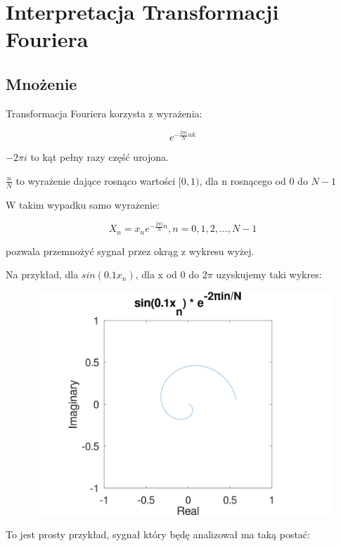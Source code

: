 \documentclass{article}
\begin{document}
\section{Interpretacja Transformacji Fouriera} 
\subsection{Mnożenie}

Transformacja Fouriera korzysta z wyrażenia:

\begin{equation}
e^{-\frac{2\pi i}{N}nk}
\end{equation}

$-2\pi i$ to kąt pełny razy część urojona.

$\frac{n}{N}$ to wyrażenie dające rosnąco wartości $[0, 1)$, dla n rosnącego od $0$ do $N-1$

W takim wypadku samo wyrażenie:

\begin{equation}
    X_n = x_n e^{-\frac{2\pi i}{N}n}, n = 0, 1, 2, ..., N-1
\end{equation}

pozwala przemnożyć sygnał przez okrąg z wykresu wyżej.

Na przykład, dla $sin(0.1x_n)$, dla x od $0$ do $2\pi$  uzyskujemy taki wykres:

\begin{figure}
\includegraphics[width=1\textwidth]{fourier.png}
\caption{}
\end{figure}

To jest prosty przykład, sygnał który będę analizował ma taką postać:
\end{document}
